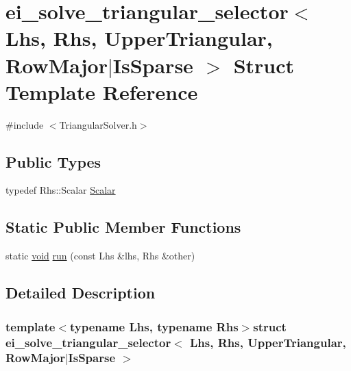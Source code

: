 \hypertarget{structei__solve__triangular__selector_3_01_lhs_00_01_rhs_00_01_upper_triangular_00_01_row_major_7_is_sparse_01_4}{\section{ei\-\_\-solve\-\_\-triangular\-\_\-selector$<$ Lhs, Rhs, Upper\-Triangular, Row\-Major$|$\-Is\-Sparse $>$ Struct Template Reference}
\label{structei__solve__triangular__selector_3_01_lhs_00_01_rhs_00_01_upper_triangular_00_01_row_major_7_is_sparse_01_4}
}


{\ttfamily \#include $<$Triangular\-Solver.\-h$>$}

\subsection*{Public Types}
\begin{DoxyCompactItemize}
\item 
typedef Rhs\-::\-Scalar \hyperlink{structei__solve__triangular__selector_3_01_lhs_00_01_rhs_00_01_upper_triangular_00_01_row_major_7_is_sparse_01_4_a5d56908a46ec73cc1206e347ed0aff87}{Scalar}
\end{DoxyCompactItemize}
\subsection*{Static Public Member Functions}
\begin{DoxyCompactItemize}
\item 
static \hyperlink{group___u_a_v_objects_plugin_ga444cf2ff3f0ecbe028adce838d373f5c}{void} \hyperlink{structei__solve__triangular__selector_3_01_lhs_00_01_rhs_00_01_upper_triangular_00_01_row_major_7_is_sparse_01_4_a108348f0c207e194fe108a2ebb28fc42}{run} (const Lhs \&lhs, Rhs \&other)
\end{DoxyCompactItemize}


\subsection{Detailed Description}
\subsubsection*{template$<$typename Lhs, typename Rhs$>$struct ei\-\_\-solve\-\_\-triangular\-\_\-selector$<$ Lhs, Rhs, Upper\-Triangular, Row\-Major$|$\-Is\-Sparse $>$}



